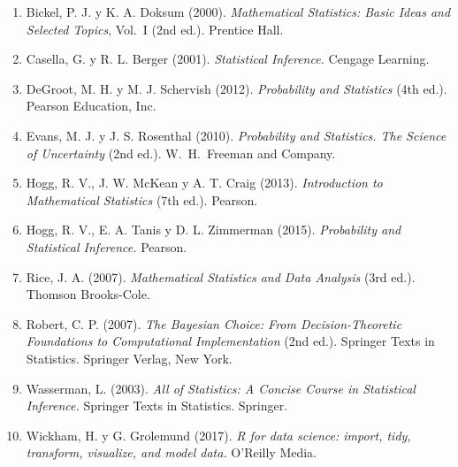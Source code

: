 \begin{refsection}
\begin{enumerate}
\item Bickel, P. J. y K. A. Doksum (2000). \emph{Mathematical Statistics: Basic Ideas and Selected Topics}, Vol.\ I (2nd ed.). Prentice Hall.
\item Casella, G. y R. L. Berger (2001). \emph{Statistical Inference.} Cengage Learning.
\item DeGroot, M. H. y M. J. Schervish (2012). \emph{Probability and Statistics} (4th ed.). Pearson Education, Inc.
\item Evans, M. J. y J. S. Rosenthal (2010). \emph{Probability and Statistics. The Science of Uncertainty} (2nd ed.). W.\ H.\ Freeman and Company.
\item Hogg, R. V., J. W. McKean y A. T. Craig (2013). \emph{Introduction to Mathematical Statistics} (7th ed.). Pearson.
\item Hogg, R. V., E. A. Tanis y D. L. Zimmerman (2015). \emph{Probability and Statistical Inference.} Pearson.
\item Rice, J. A. (2007). \emph{Mathematical Statistics and Data Analysis} (3rd ed.). Thomson Brooks-Cole.
\item Robert, C. P. (2007). \emph{The Bayesian Choice: From Decision-Theoretic Foundations to Computational Implementation} (2nd ed.). Springer Texts in Statistics. Springer Verlag, New York.
\item Wasserman, L. (2003). \emph{All of Statistics: A Concise Course in Statistical Inference.} Springer Texts in Statistics. Springer.
\item Wickham, H. y G. Grolemund (2017). \emph{R for data science: import, tidy, transform, visualize, and model data.} O'Reilly Media.
\end{enumerate}

\end{refsection}
